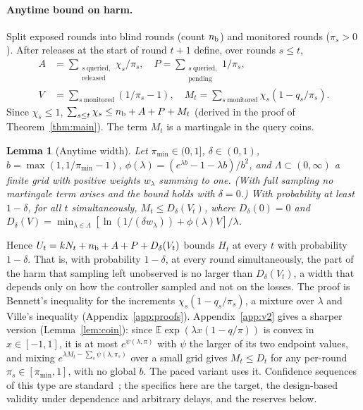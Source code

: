 \documentclass[10pt]{article}
\theoremstyle{plain}
\newtheorem{lemma}{Lemma}
\theoremstyle{definition}
\newcommand{\E}{\mathbb{E}}
\begin{document}
\paragraph{Anytime bound on harm.}
Split exposed rounds into blind rounds (count $n_{\rm b}$) and monitored rounds ($\pi_s>0$). After releases at the start of round $t+1$ define, over rounds $s\le t$,
{\small\begin{align*}
A&=\sum_{\substack{s\ \text{queried,}\\ \text{released}}}\!\chi_s/\pi_s,\quad
P=\sum_{\substack{s\ \text{queried,}\\ \text{pending}}}\!1/\pi_s,\\
V&=\sum_{s\ \text{monitored}}(1/\pi_s-1),\quad
M_t=\sum_{s\ \text{monitored}}\chi_s(1-q_s/\pi_s).
\end{align*}}
Since $\chi_s\le1$, $\sum_{s\le t}\chi_s\le n_{\rm b}+A+P+M_t$ (derived in the proof of Theorem~\ref{thm:main}). The term $M_t$ is a martingale in the query coins.

\begin{samepage}
\begin{lemma}[Anytime width]\label{lem:bennett}
Let $\pi_{\min}\in(0,1]$, $\delta\in(0,1)$, $b=\max(1,1/\pi_{\min}-1)$, $\phi(\lambda)=(e^{\lambda b}-1-\lambda b)/b^2$, and $\Lambda\subset(0,\infty)$ a finite grid with positive weights $w_\lambda$ summing to one. (With full sampling no martingale term arises and the bound holds with $\delta=0$.) With probability at least $1-\delta$, for all $t$ simultaneously, $M_t\le D_\delta(V_t)$, where $D_\delta(0)=0$ and $D_\delta(V)=\min_{\lambda\in\Lambda}[\ln(1/(\delta w_\lambda))+\phi(\lambda)V]/\lambda$.
\end{lemma}
\end{samepage}
Hence $U_t=kN_t+n_{\rm b}+A+P+D_\delta(V_t)$ bounds $H_t$ at every $t$ with probability $1-\delta$. That is, with probability $1-\delta$, at every round simultaneously, the part of the harm that sampling left unobserved is no larger than $D_\delta(V_t)$, a width that depends only on how the controller sampled and not on the losses. The proof is Bennett's inequality for the increments $\chi_s(1-q_s/\pi_s)$, a mixture over $\lambda$ and Ville's inequality (Appendix~\ref{app:proofs}). Appendix~\ref{app:v2} gives a sharper version (Lemma~\ref{lem:coin}): since $\E\exp(\lambda x(1-q/\pi))$ is convex in $x\in[-1,1]$, it is at most $e^{\psi(\lambda,\pi)}$ with $\psi$ the larger of its two endpoint values, and mixing $e^{\lambda M_t-\sum_s\psi(\lambda,\pi_s)}$ over a small grid gives $M_t\le D_t$ for any per-round $\pi_s\in[\pi_{\min},1]$, with no global $b$. The paced variant uses it. Confidence sequences of this type are standard~\citep{howard2021time,waudbysmith2024betting}; the specifics here are the target, the design-based validity under dependence and arbitrary delays, and the reserves below.
\end{document}
